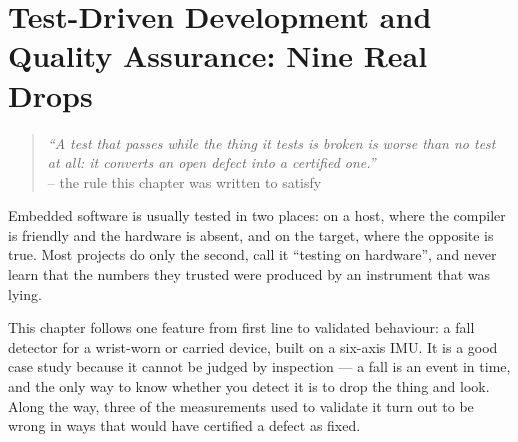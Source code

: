 
\chapter[Test-Driven Development]{Test-Driven Development and Quality Assurance: Nine Real Drops}
\label{ch:chapter-14}

\begin{quote}
    \textit{``A test that passes while the thing it tests is broken is worse than no test at
    all: it converts an open defect into a certified one.''}
    \\
    -- the rule this chapter was written to satisfy
\end{quote}

Embedded software is usually tested in two places: on a host, where the compiler is friendly
and the hardware is absent, and on the target, where the opposite is true. Most projects do
only the second, call it ``testing on hardware'', and never learn that the numbers they
trusted were produced by an instrument that was lying.

This chapter follows one feature from first line to validated behaviour: a fall detector for
a wrist-worn or carried device, built on a six-axis IMU. It is a good case study because it
cannot be judged by inspection — a fall is an event in time, and the only way to know whether
you detect it is to drop the thing and look. Along the way, three of the measurements used to
validate it turn out to be wrong in ways that would have certified a defect as fixed.

\minitoc

\clearpage








